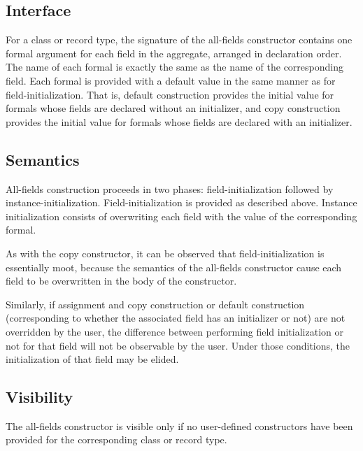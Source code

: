 \subsection{Interface}

For a class or record type, the signature of the all-fields constructor contains
one formal argument for each field in the aggregate, arranged in declaration
order.  The name of each formal is exactly the same as the name of the
corresponding field.  Each formal is provided with a default value in the same
manner as for field-initialization.  That is, default construction provides the
initial value for formals whose fields are declared without an initializer, and
copy construction provides the initial value for formals whose fields are
declared with an initializer. 

\subsection{Semantics}

All-fields construction proceeds in two phases: field-initialization followed by
instance-initialization.  Field-initialization is provided as described above.
Instance initialization consists of overwriting each field with the value of the
corresponding formal.

\begin{note}

As with the copy constructor, it can be observed that field-initialization is
essentially moot, because the semantics of the all-fields constructor cause each
field to be overwritten in the body of the constructor.

Similarly, if assignment and copy construction or default construction
(corresponding to whether the associated field has an initializer or not) are
not overridden by the user, the difference between performing field
initialization or not for that field will not be observable by the user.  Under
those conditions, the initialization of that field may be elided.

\end{note}

\subsection{Visibility}

The all-fields constructor is visible only if no user-defined constructors have
been provided for the corresponding class or record type.

